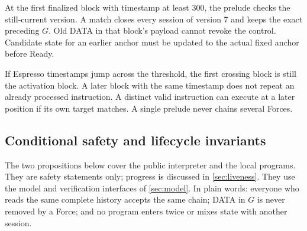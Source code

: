 \documentclass[11pt,a4paper]{article}
\begin{document}
At the first finalized block with timestamp at least 300, the prelude
checks the still-current version. A match closes every session of
version 7 and keeps the exact preceding $G$. Old DATA in that block's
payload cannot revoke the control. Candidate state for an earlier anchor
must be updated to the actual fixed anchor before Ready.

If Espresso timestamps jump across the threshold, the first crossing
block is still the activation block. A later block with the same
timestamp does not repeat an already processed instruction. A distinct
valid instruction can execute at a later position if its own target
matches. A single prelude never chains several Forces.

\subsection{Conditional safety and lifecycle invariants}
\label{sec:safety-argument}
The two propositions below cover the public interpreter and the local
programs. They are safety statements only; progress is discussed in
\cref{sec:liveness}. They use the model and verification interfaces of
\cref{sec:model}. In plain words: everyone who reads the same complete
history accepts the same chain; DATA in $G$ is never removed by a Force;
and no program enters twice or mixes state with another session.
\end{document}
